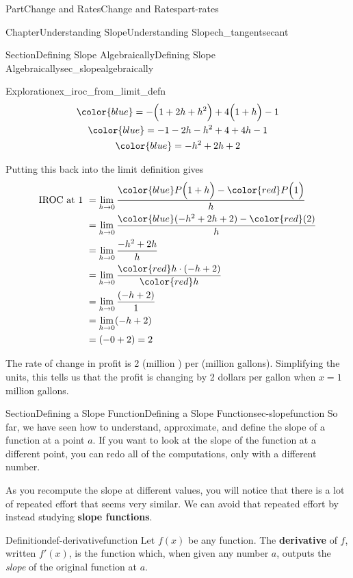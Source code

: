 \documentclass[oneside,10pt,]{tufte-book}
\newcommand{\terminology}[1]{\textbf{#1}}
\numberwithin{equation}{chapter}
\newcommand{\amp}{&}
\begin{document}
\begin{partptx}{Part}{Change and Rates}{}{Change and Rates}{}{}{part-rates}
\begin{chapterptx}{Chapter}{Understanding Slope}{}{Understanding Slope}{}{}{ch_tangentsecant}
\begin{sectionptx}{Section}{Defining Slope Algebraically}{}{Defining Slope Algebraically}{}{}{sec_slopealgebraically}
\begin{exploration}{Exploration}{}{ex_iroc_from_limit_defn}
\begin{gather*}
\color{blue} = -\Big(1 + 2h + h^2\Big) + 4\Big(1 + h\Big) - 1\\
\color{blue} = -1 - 2h - h^2 + 4 + 4h - 1\\
\color{blue} = - h^2  + 2h +2 
\end{gather*}
%
\par
Putting this back into the limit definition gives%
\begin{align*}
\text{IROC at 1 } \amp = \lim_{h\rightarrow 0} \dfrac{  {\color{blue}P\Big(1+h\Big)} - {\color{red} P\Big(1\Big)}  }{h}\\
\amp = \lim_{h\rightarrow 0} \dfrac{ {\color{blue} ( - h^2  + 2h +2 )} - {\color{red} (2) }  }{h}\\
\amp = \lim_{h\rightarrow 0} \dfrac{ - h^2  + 2h }{h}\\
\amp = \lim_{h\rightarrow 0} \dfrac{ {\color{red} h}\cdot(-h  + 2) }{\color{red} h}\\
\amp = \lim_{h\rightarrow 0} \dfrac{ (-h  + 2) }{1}\\
\amp = \lim_{h\rightarrow 0} (-h  + 2) \\
\amp =  (-0  + 2) = 2 
\end{align*}
%
\par
The rate of change in profit is 2 (million \textdollar{}) per (million gallons).  Simplifying the units, this tells us that the profit is changing by 2 dollars per gallon when \(x=1\) million gallons.%
\end{exploration}%
\end{sectionptx}
%
%
\typeout{************************************************}
\typeout{************************************************}
%
\begin{sectionptx}{Section}{Defining a Slope Function}{}{Defining a Slope Function}{}{}{sec-slopefunction}
So far, we have seen how to understand, approximate, and define the slope of a function at a point \(a\). If you want to look at the slope of the function at a different point, you can redo all of the computations, only with a different number.%
\par
As you recompute the slope at different values, you will notice that there is a lot of repeated effort that seems very similar.  We can avoid that repeated effort by instead studying \terminology{slope functions}.%
\begin{definition}{Definition}{}{def-derivativefunction}%
Let \(f(x)\) be any function. The \terminology{derivative} of \(f\), written \(f'(x)\), is the function which, when given any number \(a\), outputs the \emph{slope} of the original function at \(a\).%

\end{definition}
\end{sectionptx}
\end{chapterptx}
\end{partptx}
\end{document}
